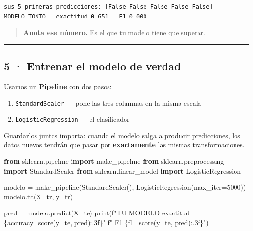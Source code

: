 \documentclass[
]{article}
\newenvironment{Shaded}{}{}
\newcommand{\BuiltInTok}[1]{\textcolor[rgb]{0.00,0.50,0.00}{#1}}
\newcommand{\DecValTok}[1]{\textcolor[rgb]{0.25,0.63,0.44}{#1}}
\newcommand{\ImportTok}[1]{\textcolor[rgb]{0.00,0.50,0.00}{\textbf{#1}}}
\newcommand{\NormalTok}[1]{#1}
\newcommand{\OperatorTok}[1]{\textcolor[rgb]{0.40,0.40,0.40}{#1}}
\newcommand{\SpecialCharTok}[1]{\textcolor[rgb]{0.25,0.44,0.63}{#1}}
\newcommand{\SpecialStringTok}[1]{\textcolor[rgb]{0.73,0.40,0.53}{#1}}
\providecommand{\tightlist}{%
  \setlength{\itemsep}{0pt}\setlength{\parskip}{0pt}}
\begin{document}
\begin{verbatim}
sus 5 primeras predicciones: [False False False False False]
MODELO TONTO   exactitud 0.651   F1 0.000
\end{verbatim}

\protect{}\label{3e6dfdc9}
\begin{quote}
\textbf{Anota ese número.} Es el que tu modelo tiene que superar.
\end{quote}

\protect{}\label{4cae6374}
\begin{center}\rule{0.5\linewidth}{0.5pt}\end{center}

\subsection{5 · Entrenar el modelo de
verdad}\label{5--entrenar-el-modelo-de-verdad}

Usamos un \textbf{Pipeline} con dos pasos:

\begin{enumerate}
\tightlist
\item
  \texttt{StandardScaler} --- pone las tres columnas en la misma escala
\item
  \texttt{LogisticRegression} --- el clasificador
\end{enumerate}

Guardarlos juntos importa: cuando el modelo salga a producir
predicciones, los datos nuevos tendrán que pasar por
\textbf{exactamente} las mismas transformaciones.

\protect{}\label{a850a8aa}
\begin{Shaded}
\begin{Highlighting}[]
\ImportTok{from}\NormalTok{ sklearn.pipeline }\ImportTok{import}\NormalTok{ make\_pipeline}
\ImportTok{from}\NormalTok{ sklearn.preprocessing }\ImportTok{import}\NormalTok{ StandardScaler}
\ImportTok{from}\NormalTok{ sklearn.linear\_model }\ImportTok{import}\NormalTok{ LogisticRegression}

\NormalTok{modelo }\OperatorTok{=}\NormalTok{ make\_pipeline(StandardScaler(), LogisticRegression(max\_iter}\OperatorTok{=}\DecValTok{5000}\NormalTok{))}
\NormalTok{modelo.fit(X\_tr, y\_tr)}

\NormalTok{pred }\OperatorTok{=}\NormalTok{ modelo.predict(X\_te)}
\BuiltInTok{print}\NormalTok{(}\SpecialStringTok{f"TU MODELO      exactitud }\SpecialCharTok{\{}\NormalTok{accuracy\_score(y\_te, pred)}\SpecialCharTok{:.3f\}}\SpecialStringTok{"}
      \SpecialStringTok{f"   F1 }\SpecialCharTok{\{}\NormalTok{f1\_score(y\_te, pred)}\SpecialCharTok{:.3f\}}\SpecialStringTok{"}\NormalTok{)}
\end{Highlighting}
\end{Shaded}
\end{document}
